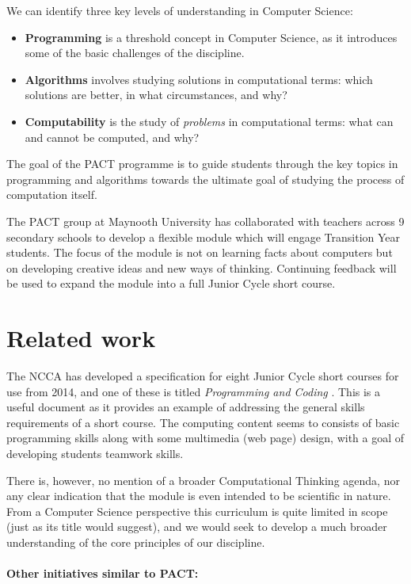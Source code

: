 \documentclass[a4paper]{article}
\begin{document}
We can identify three key levels of understanding in Computer Science:
\begin{itemize}
\item \textbf{Programming} is a threshold concept in Computer Science, as it introduces some of the basic challenges of the discipline.  
\item \textbf{Algorithms} involves studying solutions in computational terms: which solutions are better, in what circumstances, and why?
\item \textbf{Computability} is the study of \textit{problems} in 
computational terms: what can and cannot be computed, and why?
\end{itemize}

The goal of the PACT programme is to guide students through the key topics in programming and algorithms towards the ultimate goal of studying the process of computation itself.

The PACT group at Maynooth University has collaborated with teachers across 9 secondary schools to develop a flexible module which will engage Transition Year students.  The focus of the module is not on learning facts about computers but on developing creative ideas and new ways of thinking.  Continuing feedback will be used to expand the module into a full Junior Cycle short course. 

\section{Related work} \label{sect:relWork}

The NCCA has developed a specification for eight Junior Cycle short courses for use from 2014, and one of these is 
titled \textit{Programming and Coding} \cite{ncca-prog13}.  This is a useful document as it provides an example of addressing the general skills requirements of a short course.  The computing content seems to consists of basic programming skills along with some multimedia (web page) design, with a goal of developing students teamwork skills.  

There is, however, no mention of a broader Computational Thinking agenda, nor any clear indication that the module is even intended to be scientific in nature.  From a Computer Science perspective this curriculum is quite limited in scope (just as its title would suggest), and we would seek to develop a much broader understanding of the core principles of our discipline.

\paragraph{Other initiatives similar to PACT:}
\end{document}
